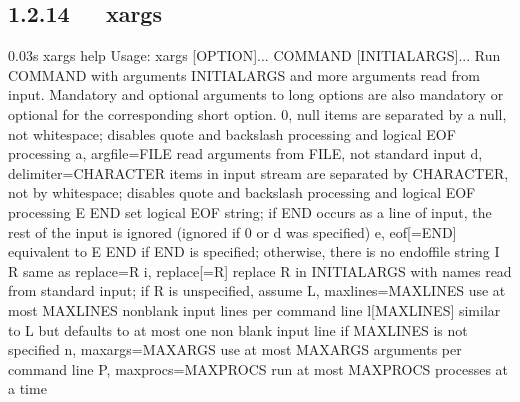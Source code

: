 \documentclass[letterpaper,12pt,english]{sphinxmanual}
\begin{document}
\subsection{1.2.14   xargs}
\label{\detokenize{001software/001install/linux:xargs}}
\begin{sphinxVerbatim}[commandchars=\\\{\}]
0.03s\PYGZdl{} xargs \PYGZhy{}\PYGZhy{}help
Usage: xargs [OPTION]... COMMAND [INITIAL\PYGZhy{}ARGS]...
Run COMMAND with arguments INITIAL\PYGZhy{}ARGS and more arguments read from input.
Mandatory and optional arguments to long options are also
mandatory or optional for the corresponding short option.
  \PYGZhy{}0, \PYGZhy{}\PYGZhy{}null                   items are separated by a null, not whitespace;
                                 disables quote and backslash processing and
                                 logical EOF processing
  \PYGZhy{}a, \PYGZhy{}\PYGZhy{}arg\PYGZhy{}file=FILE          read arguments from FILE, not standard input
  \PYGZhy{}d, \PYGZhy{}\PYGZhy{}delimiter=CHARACTER    items in input stream are separated by CHARACTER,
                                 not by whitespace; disables quote and backslash
                                 processing and logical EOF processing
  \PYGZhy{}E END                       set logical EOF string; if END occurs as a line
                                 of input, the rest of the input is ignored
                                 (ignored if \PYGZhy{}0 or \PYGZhy{}d was specified)
  \PYGZhy{}e, \PYGZhy{}\PYGZhy{}eof[=END]              equivalent to \PYGZhy{}E END if END is specified;
                                 otherwise, there is no end\PYGZhy{}of\PYGZhy{}file string
  \PYGZhy{}I R                         same as \PYGZhy{}\PYGZhy{}replace=R
  \PYGZhy{}i, \PYGZhy{}\PYGZhy{}replace[=R]            replace R in INITIAL\PYGZhy{}ARGS with names read
                                 from standard input; if R is unspecified,
                                 assume \PYGZob{}\PYGZcb{}
  \PYGZhy{}L, \PYGZhy{}\PYGZhy{}max\PYGZhy{}lines=MAX\PYGZhy{}LINES    use at most MAX\PYGZhy{}LINES non\PYGZhy{}blank input lines per
                                 command line
  \PYGZhy{}l[MAX\PYGZhy{}LINES]                similar to \PYGZhy{}L but defaults to at most one non\PYGZhy{}
                                 blank input line if MAX\PYGZhy{}LINES is not specified
  \PYGZhy{}n, \PYGZhy{}\PYGZhy{}max\PYGZhy{}args=MAX\PYGZhy{}ARGS      use at most MAX\PYGZhy{}ARGS arguments per command line
  \PYGZhy{}P, \PYGZhy{}\PYGZhy{}max\PYGZhy{}procs=MAX\PYGZhy{}PROCS    run at most MAX\PYGZhy{}PROCS processes at a time

\end{sphinxVerbatim}
\end{document}

